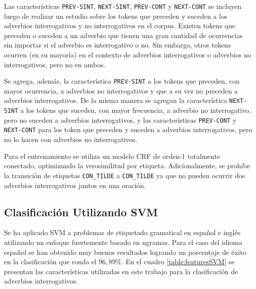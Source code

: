 \documentclass[runningheads,a4paper]{llncs}
\begin{document}
Las características \texttt{\small PREV-SINT}, \texttt{\small NEXT-SINT}, \texttt{\small PREV-CONT} y \texttt{\small NEXT-CONT} se incluyen luego de realizar un estudio sobre los tokens que preceden y  suceden a los adverbios interrogativos y no interrogativos en el corpus. Existen tokens que preceden o suceden a un adverbio que tienen una gran cantidad de ocurrencias sin importar si el adverbio es interrogativo o no. Sin embargo, otros tokens ocurren (en su mayoría) en el contexto de adverbios interrogativos o adverbios no interrogativos, pero no en ambos.

Se agrega, además, la característica \texttt{\small PREV-SINT} a los tokens que preceden, con mayor ocurrencia, a adverbios no interrogativos y que a su vez no preceden a adverbios interrogativos. De la misma manera se agregan la característica \texttt{\small NEXT-SINT} a los tokens que suceden, con mayor frecuencia, a adverbio no interrogativo, pero no suceden a adverbios interrogativos, y  las características \texttt{\small PREV-CONT} y \texttt{\small NEXT-CONT} para los token que preceden y suceden a adverbios interrogativos, pero no lo hacen con adverbios no interrogativos.

Para el entrenamiento se utiliza un modelo CRF de orden-1 totalmente conectado, optimizando la verosimilitud por etiqueta. Adicionalmente, se prohibe la transición de etiquetas \texttt{\small CON\_TILDE} a \texttt{\small CON\_TILDE} ya que no pueden ocurrir dos adverbios interrogativos juntos en una oración. 

\subsection{Clasificación Utilizando SVM}

Se ha aplicado SVM a problemas de etiquetado gramatical en español e ingl\'es utilizando un enfoque fuertemente basado en ngramas. Para el caso del idioma español se han obtenido muy buenos resultados logrando un porcentaje de éxito en la clasificación que ronda el $96,89\%$\cite{GIMENEZ04}. En el cuadro \ref{table:featuresSVM} se presentan las características utilizadas en este trabajo para la clasificación de adverbios interrogativos.
\end{document}
